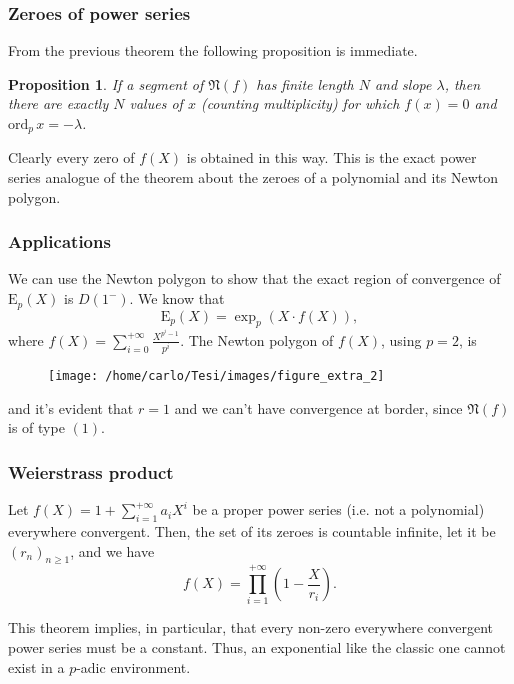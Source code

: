 \documentclass{beamer}
\newcommand{\E}{ \mathrm{E} } %
\newcommand{\padic}{$p$-adic }
\newcommand{\newt}[1]{ \mathfrak{N}(#1) } %
\theoremstyle{plain}
\newtheorem{prop}{Proposition}
\begin{document}
	\begin{frame}
		\frametitle{Zeroes of power series}
		From the previous theorem the following proposition is immediate.
		\begin{prop}
			If a segment of $\newt{f}$ has finite length $N$ and slope $\lambda$, then there are exactly $N$ values of $x$ (counting multiplicity) for which $f(x) = 0$ and $\mathrm{ord}_p\,x = -\lambda$.
		\end{prop}
		Clearly every zero of $f(X)$ is obtained in this way. This is the exact power series analogue of the theorem about the zeroes of a polynomial and its Newton polygon.
	\end{frame}
	\begin{frame}
		\frametitle{Applications}
		We can use the Newton polygon to show that the exact region of convergence of $\E_p(X)$ is $D(1^-)$.  We know that
		\[
			\E_p(X) = \exp_p\left(X \cdot f(X)\right),
		\]
		where $f(X) = \sum_{i=0}^{+\infty} \tfrac{X^{p^i - 1}}{p^i}$. The Newton polygon of $f(X)$, using $p=2$, is
		\begin{figure}[H]
			\texttt{[image: /home/carlo/Tesi/images/figure\_extra\_2]}
		\end{figure}
		and it's evident that $r = 1$ and we can't have convergence at border, since $\newt{f}$ is of type $(1)$.
	\end{frame}
	\begin{frame}
		\frametitle{Weierstrass product}
		\begin{theorem}
			Let $f(X) = 1 + \sum_{i=1}^{+\infty} a_iX^i$ be a proper power series (i.e. not a polynomial) everywhere convergent. Then, the set of its zeroes is countable infinite, let it be $(r_n)_{n\geq 1}$, and we have
			\[
				f(X) = \prod_{i=1}^{+\infty} \left(1 - \frac{X}{r_i}\right).
			\]
		\end{theorem}
		\pause
		This theorem implies, in particular, that every non-zero everywhere convergent power series must be a constant. Thus, an exponential like the classic one cannot exist in a \padic environment.
	\end{frame}
\end{document}
